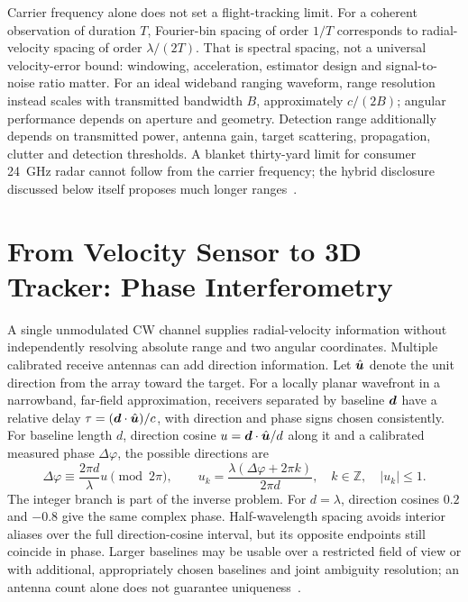 Carrier frequency alone does not set a flight-tracking limit.
For a coherent observation of duration $T$, Fourier-bin spacing of order $1/T$ corresponds to radial-velocity spacing of order $\lambda/(2T)$.
That is spectral spacing, not a universal velocity-error bound: windowing, acceleration, estimator design and signal-to-noise ratio matter.
For an ideal wideband ranging waveform, range resolution instead scales with transmitted bandwidth $B$, approximately $c/(2B)$; angular performance depends on aperture and geometry.
Detection range additionally depends on transmitted power, antenna gain, target scattering, propagation, clutter and detection thresholds.
A blanket thirty-yard limit for consumer \SI{24}{\giga\hertz} radar cannot follow from the carrier frequency; the hybrid disclosure discussed below itself proposes much longer ranges~\cite{fullswingpatent}.

\section{From Velocity Sensor to 3D Tracker: Phase Interferometry}
\label{sec:interferometry}

A single unmodulated CW channel supplies radial-velocity information without independently resolving absolute range and two angular coordinates.
Multiple calibrated receive antennas can add direction information.
Let $\hat{\bm{u}}$ denote the unit direction from the array toward the target.
For a locally planar wavefront in a narrowband, far-field approximation, receivers separated by baseline $\bm{d}$ have a relative delay $\tau=(\bm{d}\cdot\hat{\bm{u}})/c$, with direction and phase signs chosen consistently.
For baseline length $d$, direction cosine $u=\bm{d}\cdot\hat{\bm{u}}/d$ along it and a calibrated measured phase $\Delta\varphi$, the possible directions are
\begin{equation}
\label{eq:interferometry}
\Delta\varphi \equiv \frac{2\pi d}{\lambda}u \pmod{2\pi},
\qquad
u_k=\frac{\lambda(\Delta\varphi+2\pi k)}{2\pi d},
\quad k\in\mathbb Z,\quad |u_k|\leq1.
\end{equation}
The integer branch is part of the inverse problem.
For $d=\lambda$, direction cosines $0.2$ and $-0.8$ give the same complex phase.
Half-wavelength spacing avoids interior aliases over the full direction-cosine interval, but its opposite endpoints still coincide in phase.
Larger baselines may be usable over a restricted field of view or with additional, appropriately chosen baselines and joint ambiguity resolution; an antenna count alone does not guarantee uniqueness~\cite{us9958527}.

